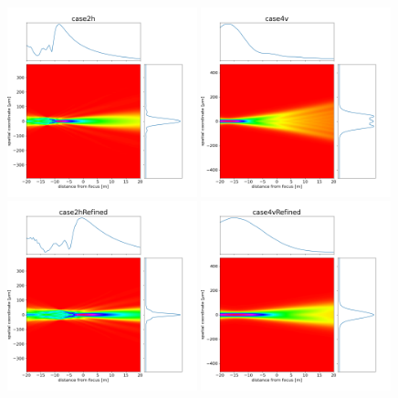\documentclass{iucr}              %
\begin{document}


\begin{figure}\label{fig:causticcorrection}
\centering


\includegraphics[width=0.49\textwidth]{figures/case2h_caustic.png}
\includegraphics[width=0.49\textwidth]{figures/case4v_caustic.png}
\includegraphics[width=0.49\textwidth]{figures/case2hRefined_caustic.png}
\includegraphics[width=0.49\textwidth]{figures/case4vRefined_caustic.png}

\end{figure}
\end{document}
